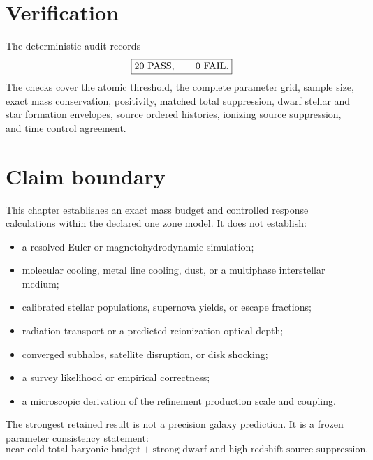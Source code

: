 \section{Verification}

The deterministic audit records
\begin{equation}
\boxed{
20\ {\rm PASS},
\qquad
0\ {\rm FAIL}.
}
\label{eq:cfr-pass-count}
\end{equation}
The checks cover the atomic threshold, the complete parameter grid, sample size, exact mass conservation, positivity, matched total suppression, dwarf stellar and star formation envelopes, source ordered histories, ionizing source suppression, and time control agreement.

\section{Claim boundary}

This chapter establishes an exact mass budget and controlled response calculations within the declared one zone model.  It does not establish:
\begin{itemize}
\item a resolved Euler or magnetohydrodynamic simulation;
\item molecular cooling, metal line cooling, dust, or a multiphase interstellar medium;
\item calibrated stellar populations, supernova yields, or escape fractions;
\item radiation transport or a predicted reionization optical depth;
\item converged subhalos, satellite disruption, or disk shocking;
\item a survey likelihood or empirical correctness;
\item a microscopic derivation of the refinement production scale and coupling.
\end{itemize}

The strongest retained result is not a precision galaxy prediction.  It is a frozen parameter consistency statement:
\begin{equation}
\boxed{
\text{near cold total baryonic budget}
+
\text{strong dwarf and high redshift source suppression}.
}
\label{eq:cfr-retained-signature}
\end{equation}
